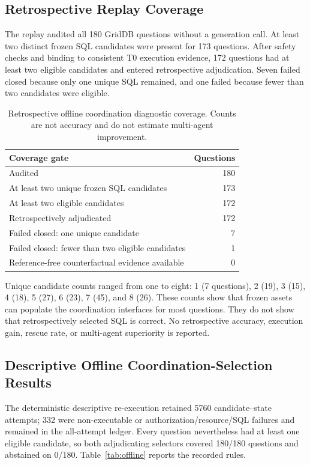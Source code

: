 \documentclass[applsci,article,submit,moreauthors]{Definitions/mdpi}
\begin{document}
\subsection{Retrospective Replay Coverage}

The replay audited all 180 GridDB questions without a generation call. At least two distinct frozen SQL candidates were present for 173 questions. After safety checks and binding to consistent T0 execution evidence, 172 questions had at least two eligible candidates and entered retrospective adjudication. Seven failed closed because only one unique SQL remained, and one failed because fewer than two candidates were eligible.

\begin{table}[htbp]
\caption{Retrospective offline coordination diagnostic coverage. Counts are not accuracy and do not estimate multi-agent improvement.}
\label{tab:replay}
\centering
\begin{tabular}{lr}
\toprule
Coverage gate & Questions\\
\midrule
Audited & 180\\
At least two unique frozen SQL candidates & 173\\
At least two eligible candidates & 172\\
Retrospectively adjudicated & 172\\
Failed closed: one unique candidate & 7\\
Failed closed: fewer than two eligible candidates & 1\\
Reference-free counterfactual evidence available & 0\\
\bottomrule
\end{tabular}
\end{table}

Unique candidate counts ranged from one to eight: 1 (7 questions), 2 (19), 3 (15), 4 (18), 5 (27), 6 (23), 7 (45), and 8 (26). These counts show that frozen assets can populate the coordination interfaces for most questions. They do not show that retrospectively selected SQL is correct. No retrospective accuracy, execution gain, rescue rate, or multi-agent superiority is reported.

\subsection{Descriptive Offline Coordination-Selection Results}

The deterministic descriptive re-execution retained 5760 candidate--state attempts; 332 were non-executable or authorization/resource/SQL failures and remained in the all-attempt ledger. Every question nevertheless had at least one eligible candidate, so both adjudicating selectors covered 180/180 questions and abstained on 0/180. Table~\ref{tab:offline} reports the recorded rules.
\end{document}
